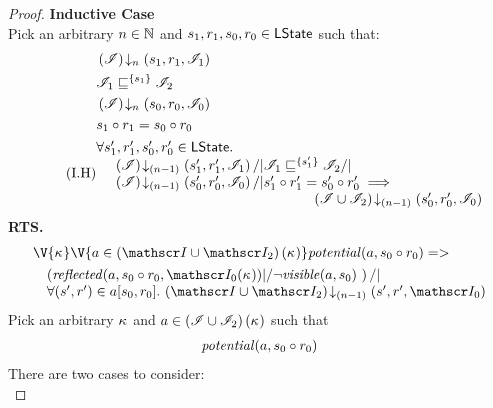 \begin{lemma}
\begin{proof}
\noindent\textbf{Inductive Case}\\
Pick an arbitrary $n \in \mathbb{N}$ and $s_1, r_1, s_0, r_0 \in \textsf{LState}$ such that:
\begin{align}
	&\extendsAMUpto{\lmod}{n}{s_1}{r_1}{\lmod_1} \label{LSC2:Ass1}\\
	&\lmod_1 \weakenI{\{s_1\}} \lmod_2 \label{LSC2:Ass2}\\
	& \extendsAMUpto{\lmod}{n}{s_0}{r_0}{\lmod_0} \label{LSC2:Ass3}\\
	& s_1 \composeL r_1 = s_0 \composeL r_0 \label{LSC2:Ass4}\\
	\tag{I.H}	
	&\begin{array}{@{} l @{\hspace{-3cm}} l @{\hspace*{-2cm}} l @{}}
		\for{s'_1, r'_1, s'_0, r'_0 \in \LStates} &&\\
		& \extendsAMUpto{\lmod}{(n-1)}{s'_1}{r'_1}{\lmod_1} /| \lmod_1 \weakenI{\{s'_1\}} \lmod_2 /| & \\
		& \extendsAMUpto{\lmod}{(n-1)}{s'_0}{r'_0}{\lmod_0} /| s'_1 \composeL r'_1 = s'_0 \composeL r'_0 \implies & \\
		&& \extendsAMUpto{\lmod \cup \lmod_2}{(n-1)}{s'_0}{r'_0}{\lmod_0}
	\end{array} \label{LSC2:IH}
\end{align}
%
\textbf{RTS. } 
%
\begin{align}
  &\V{\ca{}}\V{a\in \left(\lmod \cup \lmod_2 \right) (\ca{})}
  \m{potential}(a, s_0 \composeL r_0) =>\null \nonumber \\
  &\quad\begin{array}{@{} l @{}}
		\left(\m{reflected}(a,s_0 \composeL r_0, \lmod_0(\ca{})) |/ \neg\m{visible}(a, s_0) \ \right) /| \\
		\for{(s', r') \in a[s_0, r_0]} \extendsAMUpto{\lmod \cup \lmod_2}{(n-1)}{s'}{r'}{\lmod_0}
 	\end{array}
  \label{LSC2:Goal3}
\end{align}
%
Pick an arbitrary $\kappa_{}$ and $a \in \left(\mathscr{I} \cup \mathscr{I}_2 \right)(\kappa_{})$ such that
%
\begin{align}
	\mathit{potential}(a, s_0 \circ r_0) \label{LSC2:Ass5}
\end{align}
There are two cases to consider:\\


\end{proof}
\end{lemma}
